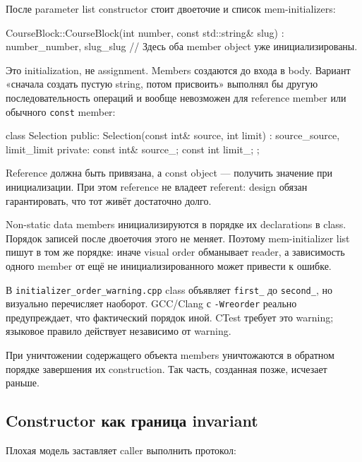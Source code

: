 После parameter list constructor стоит двоеточие и список mem-initializers:

\begin{cppcode}
CourseBlock::CourseBlock(int number, const std::string& slug)
    : number_{number}, slug_{slug} {
    // Здесь оба member object уже инициализированы.
}
\end{cppcode}

Это initialization, не assignment. Members создаются до входа в body. Вариант
«сначала создать пустую string, потом присвоить» выполнял бы другую
последовательность операций и вообще невозможен для reference member или
обычного \texttt{const} member:

\begin{cppcode}
class Selection {
public:
    Selection(const int& source, int limit)
        : source_{source}, limit_{limit} {}
private:
    const int& source_;
    const int limit_;
};
\end{cppcode}

Reference должна быть привязана, а const object --- получить значение при
инициализации. При этом reference не владеет referent: design обязан
гарантировать, что тот живёт достаточно долго.

\begin{warningbox}
Non-static data members инициализируются в порядке их declarations в class.
Порядок записей после двоеточия этого не меняет. Поэтому mem-initializer list
пишут в том же порядке: иначе visual order обманывает reader, а зависимость
одного member от ещё не инициализированного может привести к ошибке.
\end{warningbox}

В \texttt{initializer\_order\_warning.cpp} class объявляет \texttt{first\_}
до \texttt{second\_}, но визуально перечисляет наоборот. GCC/Clang с
\texttt{-Wreorder} реально предупреждает, что фактический порядок иной.
CTest требует это warning; языковое правило действует независимо от warning.

При уничтожении содержащего объекта members уничтожаются в обратном порядке
завершения их construction. Так часть, созданная позже, исчезает раньше.

\subsection{Constructor как граница invariant}

Плохая модель заставляет caller выполнить протокол:

